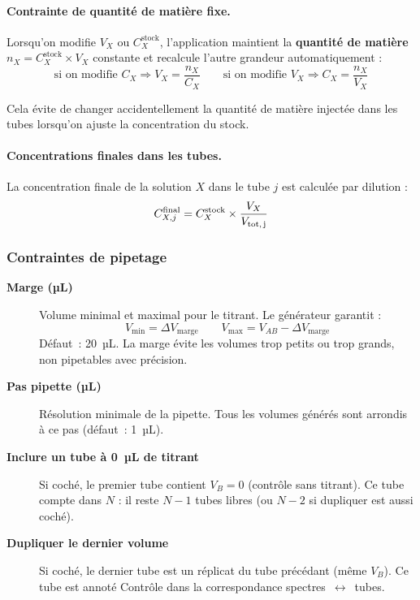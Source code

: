 \documentclass[12pt, a4paper]{article}
\begin{document}
\paragraph{Contrainte de quantité de matière fixe.}
Lorsqu'on modifie $V_X$ ou $C_X^\text{stock}$, l'application maintient la
\textbf{quantité de matière} $n_X = C_X^\text{stock} \times V_X$ constante
et recalcule l'autre grandeur automatiquement :
\[
\text{si on modifie } C_X \Rightarrow V_X = \frac{n_X}{C_X}
\qquad
\text{si on modifie } V_X \Rightarrow C_X = \frac{n_X}{V_X}
\]

Cela évite de changer accidentellement la quantité de matière injectée dans
les tubes lorsqu'on ajuste la concentration du stock.

\paragraph{Concentrations finales dans les tubes.}
La concentration finale de la solution $X$ dans le tube $j$ est calculée
par dilution :
\[
C_{X,j}^\text{final} = C_X^\text{stock} \times \frac{V_X}{V_\text{tot,\,j}}
\]

\subsubsection{Contraintes de pipetage}

\begin{description}
  \item[\textbf{Marge (µL)}] Volume minimal et maximal pour le titrant. Le
        générateur garantit :
        \[
          V_\text{min} = \Delta V_\text{marge}
          \qquad
          V_\text{max} = V_{AB} - \Delta V_\text{marge}
        \]
        Défaut~: 20~µL. La marge évite les volumes trop petits ou trop
        grands, non pipetables avec précision.

  \item[\textbf{Pas pipette (µL)}] Résolution minimale de la pipette. Tous
        les volumes générés sont arrondis à ce pas (défaut~: 1~µL).

  \item[\textbf{Inclure un tube à 0~µL de titrant}] Si coché, le premier
        tube contient $V_B = 0$ (contrôle sans titrant). Ce tube compte dans
        $N$ : il reste $N - 1$ tubes libres (ou $N - 2$ si \og dupliquer\fg{}
        est aussi coché).

  \item[\textbf{Dupliquer le dernier volume}] Si coché, le dernier tube est
        un réplicat du tube précédant (même $V_B$). Ce tube est annoté
        \og Contrôle\fg{} dans la correspondance spectres~$\leftrightarrow$~tubes.
\end{description}
\end{document}
